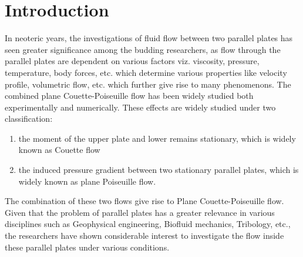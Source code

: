 \documentclass[14pt,one side, a4paper]{extbook}
\begin{document}
	 	\section{Introduction}
	 	In neoteric years, the investigations of fluid flow between two parallel plates has seen greater significance among the budding researchers, as flow through the parallel plates are dependent on various factors viz. viscosity, pressure, temperature, body forces, etc. which determine various properties like velocity profile, volumetric flow, etc. which further give rise to many phenomenons\cite{pantakratoras}.
	 	The combined plane Couette-Poiseuille flow has been widely studied both experimentally and numerically.
	 	These effects are widely studied under two classification:
	 	\begin{enumerate}
	 		\item{the moment of the upper plate and lower remains stationary, which is widely known as Couette flow}
	 		\item{the induced pressure gradient between two stationary parallel plates, which is  widely known as plane Poiseuille flow.}
	 	\end{enumerate} 
	 	The combination of these two flows give rise to Plane Couette-Poiseuille flow.
	 	Given that the problem of parallel plates has a greater relevance in various disciplines such as Geophysical engineering, Biofluid mechanics, Tribology, etc., the researchers have shown considerable interest to investigate the flow inside these parallel plates under various conditions. 
\end{document}
